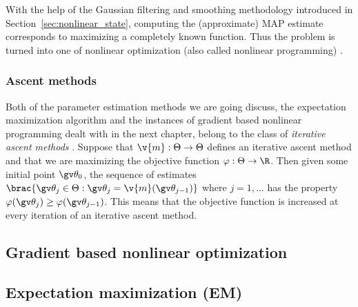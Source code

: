 With the help of the Gaussian filtering and smoothing methodology introduced in 
Section~\ref{sec:nonlinear_state}, computing the (approximate) MAP estimate 
corresponds to maximizing a completely known function.
Thus the problem is turned into one of nonlinear optimization 
(also called nonlinear programming) \parencite{Cappe2005}.

\subsubsection{Ascent methods}

Both of the parameter estimation methods we are going
discuss, the expectation maximization algorithm and
the instances of gradient based nonlinear programming dealt with in the
next chapter, belong to the class of \emph{iterative ascent methods} \parencite{luenberger2008}.
Suppose that $\v{m}:\Theta \to \Theta$ defines an iterative ascent method
and that we are maximizing the objective function $\varphi:\Theta\to\R$.
Then given some initial point $\Th_0$, the sequence of estimates
$\brac{\Th_j \in \Theta: \Th_j=\v{m}(\Th_{j-1})}$ where $j=1,\dots$
has the property $\varphi(\Th_{j})\geq \varphi(\Th_{j-1})$. This means
that the objective function is increased at every iteration of
an iterative ascent method.

\subsection{Gradient based nonlinear optimization}\label{sec:grad}%


\subsection{Expectation maximization (EM)}\label{sec:em}%


% 



